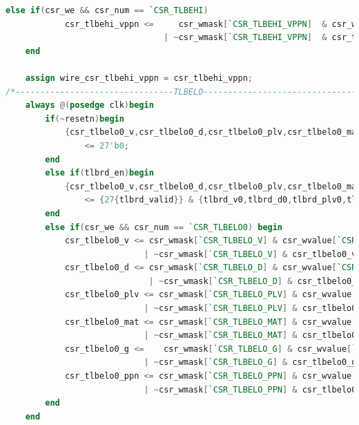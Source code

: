 \documentclass[11pt]{article}
\begin{document}
\begin{enumerate}
\begin{lstlisting}[language=verilog]
        else if(csr_we && csr_num == `CSR_TLBEHI)
            csr_tlbehi_vppn <=     csr_wmask[`CSR_TLBEHI_VPPN]  & csr_wvalue[`CSR_TLBEHI_VPPN]
                                | ~csr_wmask[`CSR_TLBEHI_VPPN]  & csr_tlbehi_vppn;  
    end

    assign wire_csr_tlbehi_vppn = csr_tlbehi_vppn;
/*--------------------------------TLBELO--------------------------------------------------------*/
    always @(posedge clk)begin
        if(~resetn)begin
            {csr_tlbelo0_v,csr_tlbelo0_d,csr_tlbelo0_plv,csr_tlbelo0_mat,csr_tlbelo0_g,csr_tlbelo0_ppn} 
                <= 27'b0;
        end
        else if(tlbrd_en)begin
            {csr_tlbelo0_v,csr_tlbelo0_d,csr_tlbelo0_plv,csr_tlbelo0_mat,csr_tlbelo0_g,csr_tlbelo0_ppn} 
                <= {27{tlbrd_valid}} & {tlbrd_v0,tlbrd_d0,tlbrd_plv0,tlbrd_mat0,tlbrd_g,tlbrd_ppn0}; 
        end
        else if(csr_we && csr_num == `CSR_TLBELO0) begin
            csr_tlbelo0_v <= csr_wmask[`CSR_TLBELO_V] & csr_wvalue[`CSR_TLBELO_V]
                            | ~csr_wmask[`CSR_TLBELO_V] & csr_tlbelo0_v;
            csr_tlbelo0_d <= csr_wmask[`CSR_TLBELO_D] & csr_wvalue[`CSR_TLBELO_D]
                             | ~csr_wmask[`CSR_TLBELO_D] & csr_tlbelo0_d;
            csr_tlbelo0_plv <= csr_wmask[`CSR_TLBELO_PLV] & csr_wvalue[`CSR_TLBELO_PLV]
                            | ~csr_wmask[`CSR_TLBELO_PLV] & csr_tlbelo0_plv;
            csr_tlbelo0_mat <= csr_wmask[`CSR_TLBELO_MAT] & csr_wvalue[`CSR_TLBELO_MAT]
                            | ~csr_wmask[`CSR_TLBELO_MAT] & csr_tlbelo0_mat;
            csr_tlbelo0_g <=    csr_wmask[`CSR_TLBELO_G] & csr_wvalue[`CSR_TLBELO_G]
                            | ~csr_wmask[`CSR_TLBELO_G] & csr_tlbelo0_g;
            csr_tlbelo0_ppn <= csr_wmask[`CSR_TLBELO_PPN] & csr_wvalue[`CSR_TLBELO_PPN]
                            | ~csr_wmask[`CSR_TLBELO_PPN] & csr_tlbelo0_ppn;
        end
    end


\end{lstlisting}
\end{enumerate}
\end{document}
